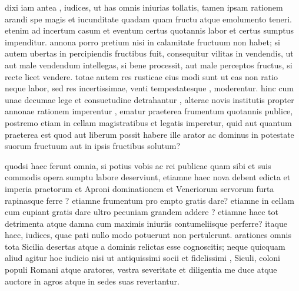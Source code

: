  dixi iam antea , iudices, ut has omnis iniurias tollatis, tamen ipsam rationem arandi spe magis et iucunditate quadam quam fructu atque emolumento teneri. etenim ad incertum casum et eventum certus quotannis labor et certus sumptus impenditur. annona porro pretium nisi in calamitate fructuum non habet; si autem ubertas in percipiendis fructibus fuit, consequitur vilitas in vendendis, ut aut male vendendum intellegas, si bene processit, aut male perceptos fructus, si recte licet vendere. totae autem res rusticae eius modi sunt ut eas non ratio neque labor, sed res incertissimae, venti tempestatesque , moderentur. hinc cum unae decumae lege et consuetudine detrahantur , alterae novis institutis propter annonae rationem imperentur , ematur praeterea frumentum quotannis publice, postremo etiam in cellam magistratibus et legatis imperetur, quid aut quantum praeterea est quod aut liberum possit habere ille arator ac dominus in potestate suorum fructuum aut in ipsis fructibus solutum?

 quodsi haec ferunt omnia, si potius vobis ac rei publicae quam sibi et suis commodis opera sumptu labore deserviunt, etiamne haec nova debent edicta et imperia praetorum et Aproni dominationem et Veneriorum servorum furta rapinasque ferre ? etiamne frumentum pro empto gratis dare? etiamne in cellam cum cupiant gratis dare ultro pecuniam grandem addere ? etiamne haec tot detrimenta atque damna cum maximis iniuriis contumeliisque perferre? itaque haec, iudices, quae pati nullo modo potuerunt non pertulerunt. arationes omnis tota Sicilia desertas atque a dominis relictas esse cognoscitis; neque quicquam aliud agitur hoc iudicio nisi ut antiquissimi socii et fidelissimi , Siculi, coloni populi Romani atque aratores, vestra severitate et diligentia me duce atque auctore in agros atque in sedes suas revertantur.

